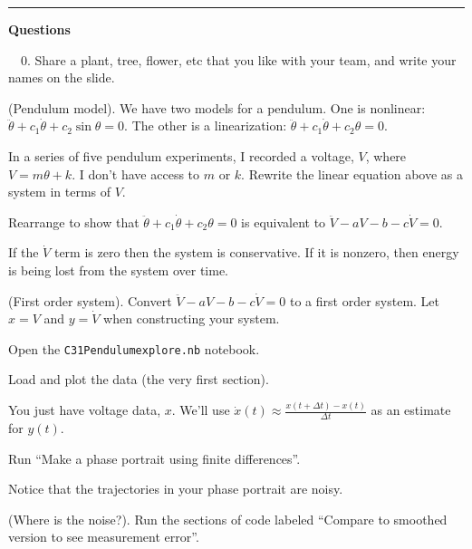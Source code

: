 \documentclass[12pt,letterpaper,noanswers]{exam}
\begin{document}
\hrule
\vspace{0.2cm}


\noindent\textbf{Questions}

\noindent \ \ 0.  Share a plant, tree, flower, etc that you like with your team, and write your names on the slide.

\begin{questions}
\question (Pendulum model).  We have two models for a pendulum.  One is nonlinear: $\ddot \theta + c_1\dot \theta + c_2\sin\theta = 0$.  The other is a linearization: $\ddot \theta + c_1 \dot \theta + c_2\theta = 0$.

\begin{parts}
\item In a series of five pendulum experiments, I recorded a voltage, $V$, where $V = m\theta + k$.  I don't have access to $m$ or $k$.  Rewrite the linear equation above as a system in terms of $V$.

\item Rearrange to show that $\ddot\theta + c_1 \dot\theta + c_2 \theta = 0$ is equivalent to $\ddot V - a V - b - c\dot V = 0$.
\end{parts}
If the $\dot V$ term is zero then the system is conservative.  If it is nonzero, then energy is being lost from the system over time.

\question (First order system).  Convert $\ddot V - aV-b-c\dot V = 0$ to a first order system.  Let $x = V$ and $y = \dot V$ when constructing your system.

\question Open the \texttt{C31Pendulumexplore.nb} notebook.
\begin{parts}
\item Load and plot the data (the very first section).

You just have voltage data, $x$.  We'll use $\dot x(t) \approx \frac{x(t+\Delta t) - x(t)}{\Delta t}$ as an estimate for $y(t)$.   
\item Run ``Make a phase portrait using finite differences''.
\end{parts}
Notice that the trajectories in your phase portrait are noisy.

\question (Where is the noise?). Run the sections of code labeled ``Compare to smoothed version to see measurement error''.  


\end{questions}
\end{document}

